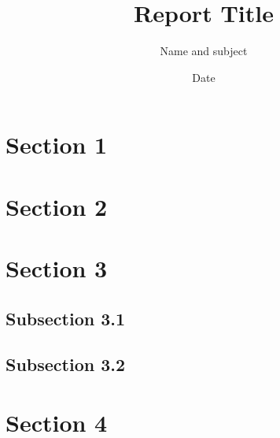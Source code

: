 \documentclass[12pt]{article}
\begin{document}
 
 
 
\title{Report Title}%
\author{Name and subject} %
\date{Date}%
 
\maketitle

\pagebreak


\tableofcontents

\pagebreak

\section{Section 1}
\pagebreak

\section{Section 2}

\pagebreak

\section{Section 3}
\subsection{Subsection 3.1}
\subsection{Subsection 3.2}

\section{Section 4}

%
%


\end{document}
